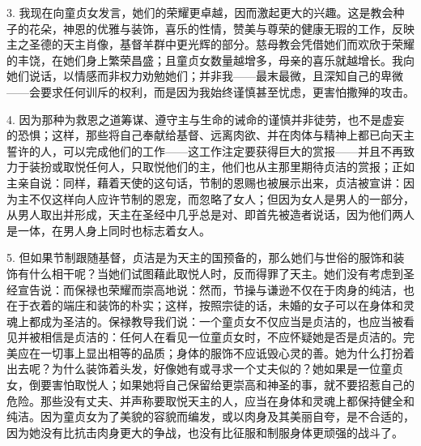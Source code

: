 3. 我现在向童贞女发言，她们的荣耀更卓越，因而激起更大的兴趣。这是教会种子的花朵，神恩的优雅与装饰，喜乐的性情，赞美与尊荣的健康无瑕的工作，反映主之圣德的天主肖像，基督羊群中更光辉的部分。慈母教会凭借她们而欢欣于荣耀的丰饶，在她们身上繁荣昌盛；且童贞女数量越增多，母亲的喜乐就越增长。我向她们说话，以情感而非权力劝勉她们；并非我——最末最微，且深知自己的卑微——会要求任何训斥的权利，而是因为我始终谨慎甚至忧虑，更害怕撒殚的攻击。\par

4. 因为那种为救恩之道筹谋、遵守主与生命的诫命的谨慎并非徒劳，也不是虚妄的恐惧；这样，那些将自己奉献给基督、远离肉欲、并在肉体与精神上都已向天主誓许的人，可以完成他们的工作——这工作注定要获得巨大的赏报——并且不再致力于装扮或取悦任何人，只取悦他们的主，他们也从主那里期待贞洁的赏报；正如主亲自说：同样，藉着天使的这句话，节制的恩赐也被展示出来，贞洁被宣讲：因为主不仅这样向人应许节制的恩宠，而忽略了女人；但因为女人是男人的一部分，从男人取出并形成，天主在圣经中几乎总是对、即首先被造者说话，因为他们两人是一体，在男人身上同时也标志着女人。\par

5. 但如果节制跟随基督，贞洁是为天主的国预备的，那么她们与世俗的服饰和装饰有什么相干呢？当她们试图藉此取悦人时，反而得罪了天主。她们没有考虑到圣经宣告说：而保禄也荣耀而崇高地说：然而，节操与谦逊不仅在于肉身的纯洁，也在于衣着的端庄和装饰的朴实；这样，按照宗徒的话，未婚的女子可以在身体和灵魂上都成为圣洁的。保禄教导我们说：一个童贞女不仅应当是贞洁的，也应当被看见并被相信是贞洁的：任何人在看见一位童贞女时，不应怀疑她是否是贞洁的。完美应在一切事上显出相等的品质；身体的服饰不应诋毁心灵的善。她为什么打扮着出去呢？为什么装饰着头发，好像她有或寻求一个丈夫似的？她如果是一位童贞女，倒要害怕取悦人；如果她将自己保留给更崇高和神圣的事，就不要招惹自己的危险。那些没有丈夫、并声称要取悦天主的人，应当在身体和灵魂上都保持健全和纯洁。因为童贞女为了美貌的容貌而编发，或以肉身及其美丽自夸，是不合适的，因为她没有比抗击肉身更大的争战，也没有比征服和制服身体更顽强的战斗了。\par


